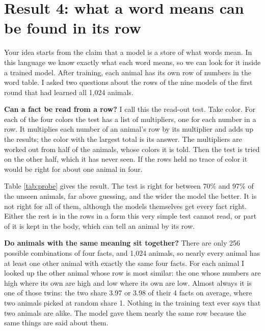 \section{Result 4: what a word means can be found in its row}\label{sec:probe}

Your idea starts from the claim that a model is a store of what words mean. In this language we
know exactly what each word means, so we can look for it inside a trained model. After training,
each animal has its own row of numbers in the word table. I asked two questions about the rows
of the nine models of the first round that had learned all 1,024 animals.

\textbf{Can a fact be read from a row?} I call this the read-out test. Take color. For each of
the four colors the test has a list of multipliers, one for each number in a row. It multiplies
each number of an animal's row by its multiplier and adds up the results; the color with the
largest total is its answer. The multipliers are worked out from half of the animals, whose
colors it is told. Then the test is tried on the other half, which it has never seen. If the
rows held no trace of color it would be right for about one animal in four.

\begin{table}[H]
\centering\small

\caption{Left four columns: how often the read-out test names the right value for animals it
was not worked out on, from their rows alone (average of the three repeats; guessing gives
25\%). Right column: how many of its four facts an animal shares with the animal whose row is
most like its own (two animals picked at random share 1.00).}
\label{tab:probe}
\end{table}

Table \ref{tab:probe} gives the result. The test is right for between 70\% and 97\% of the
unseen animals, far above guessing, and the wider the model the better. It is not right for all
of them, although the models themselves get every fact right. Either the rest is in the rows in a
form this very simple test cannot read, or part of it is kept in the body, which can tell an
animal by its row.

\textbf{Do animals with the same meaning sit together?} There are only 256 possible
combinations of four facts, and 1,024 animals, so nearly every animal has at least one other
animal with exactly the same four facts. For each animal I looked up the other animal whose
row is most similar: the one whose numbers are high where its own are high and low where its
own are low. Almost always it is one of those twins: the two share 3.97 or 3.98 of their 4 facts on average, where two animals
picked at random share 1. Nothing in the training text ever says that two animals are alike.
The model gave them nearly the same row because the same things are said about them.

